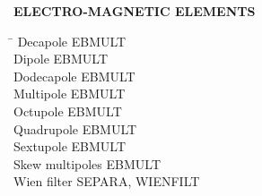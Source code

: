 \bigskip

\bigskip

\noindent\textbf{ELECTRO-MAGNETIC ELEMENTS}  

\begin{tabbing}
\hspace*{7cm} \= \kill
  Decapole                \> EBMULT \\
  Dipole                  \> EBMULT \\
  Dodecapole              \> EBMULT \\
  Multipole               \> EBMULT \\
  Octupole                \> EBMULT \\
  Quadrupole              \> EBMULT \\
  Sextupole               \> EBMULT \\
  Skew multipoles       \> EBMULT \\
  Wien filter             \> SEPARA, WIENFILT 
\end{tabbing} 

